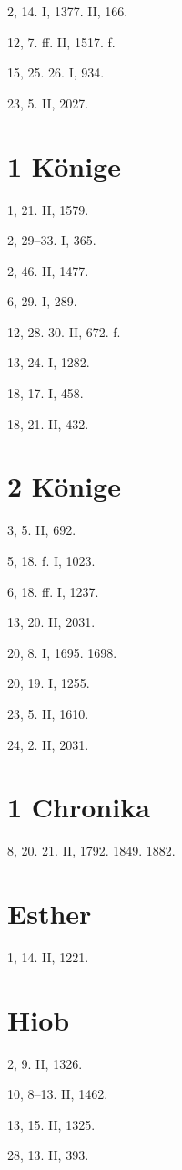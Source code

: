2, 14. I, 1377. II, 166.

12, 7. ff. II, 1517. f.

15, 25. 26. I, 934.

23, 5. II, 2027.

\section{1 Könige}

1, 21. II, 1579.

2, 29–33. I, 365.

2, 46. II, 1477.

6, 29. I, 289.

12, 28. 30. II, 672. f.

13, 24. I, 1282.

18, 17. I, 458.

18, 21. II, 432.

\section{2 Könige}

3, 5. II, 692.

5, 18. f. I, 1023.

6, 18. ff. I, 1237.

13, 20. II, 2031.

20, 8. I, 1695. 1698.

20, 19. I, 1255.

23, 5. II, 1610.

24, 2. II, 2031.

\section{1 Chronika}

8, 20. 21. II, 1792. 1849. 1882.

\section{Esther}

1, 14. II, 1221.

\section{Hiob}

2, 9. II, 1326.

10, 8–13. II, 1462.

13, 15. II, 1325.

28, 13. II, 393.

